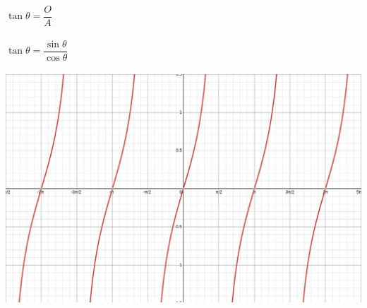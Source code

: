 \documentclass{article}
\begin{document}
\begin{multicols}{3}
    $\tan \theta = \dfrac{O}{A}$                       \\\\
    $\tan \theta = \dfrac{\sin \theta}{\cos \theta}$   \\\\
    \includegraphics[scale=0.15]{images/tan.png}
\end{multicols}
\end{document}
